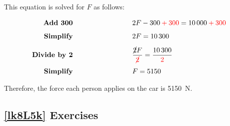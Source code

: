 \documentclass{article}
\numberwithin{equation}{section}
\numberwithin{figure}{section}
\begin{document}
This equation is solved for $F$ as follows:

\begin{align*}
    \textbf{Add 300} \hspace{9cm} 
    & \hspace{-6cm} 2F - 300 \mathbin{\textcolor{red}{+}} \textcolor{red}{300} = \SI{10000}{} \mathbin{\textcolor{red}{+}} \textcolor{red}{300}\\[1ex]
    \textbf{Simplify} \hspace{9cm}
    & \hspace{-6cm} 2F = \SI{10300}{}\\[1ex]
    \textbf{Divide by 2} \hspace{9cm}
    & \hspace{-6cm} \frac{\cancel{2}F}{\textcolor{red}{\cancel{2}}} = \frac{\SI{10300}{}}{\textcolor{red}{2}}\\[1ex]
    \textbf{Simplify} \hspace{9cm} 
    & \hspace{-6cm} F = 5150
\end{align*}

Therefore, the force each person applies on the car is \SI{5150}{N}.
\vspace{2ex}

\cyanhrule

\subsection*{\ref{lk8L5k} Exercises}
\end{document}
